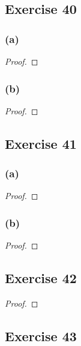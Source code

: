 \documentclass[14pt]{extarticle}
\begin{document}
\subsection{Exercise 40}

\subsubsection{(a)}

\begin{proof}

\end{proof}

\subsubsection{(b)}

\begin{proof}

\end{proof}

\subsection{Exercise 41}

\subsubsection{(a)}

\begin{proof}

\end{proof}

\subsubsection{(b)}

\begin{proof}

\end{proof}

\subsection{Exercise 42}

\begin{proof}

\end{proof}

\subsection{Exercise 43}
\end{document}
